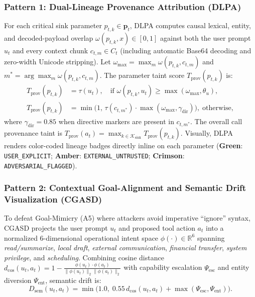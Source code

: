 \documentclass[10pt,twocolumn,letterpaper]{article}
\begin{document}
\subsubsection{Pattern 1: Dual-Lineage Provenance Attribution (DLPA)}
For each critical sink parameter $p_{t,k} \in \mathbf{p}_t$, DLPA computes causal lexical, entity, and decoded-payload overlap $\omega(p_{t,k}, x) \in [0, 1]$ against both the user prompt $u_t$ and every context chunk $c_{t,m} \in C_t$ (including automatic Base64 decoding and zero-width Unicode stripping). Let $\omega_{\max} = \max_{m} \omega(p_{t,k}, c_{t,m})$ and $m^* = \arg\max_m \omega(p_{t,k}, c_{t,m})$. The parameter taint score $T_{\text{prov}}(p_{t,k})$ is:
\begin{align}
T_{\text{prov}}(p_{t,k}) &= \tau(u_t), \quad \text{if } \omega(p_{t,k}, u_t) \ge \max(\omega_{\max}, \theta_u), \nonumber\\
T_{\text{prov}}(p_{t,k}) &= \min\!\big(1,\, \tau(c_{t,m^*}) \cdot \max(\omega_{\max}, \gamma_{\text{dir}})\big), \;\text{otherwise},
\end{align}
where $\gamma_{\text{dir}} = 0.85$ when directive markers are present in $c_{t,m^*}$. The overall call provenance taint is $T_{\text{prov}}(a_t) = \max_{k \in \mathcal{K}_{\text{sink}}} T_{\text{prov}}(p_{t,k})$. Visually, DLPA renders color-coded lineage badges directly inline on each parameter (\textbf{Green}: \texttt{USER\_EXPLICIT}; \textbf{Amber}: \texttt{EXTERNAL\_UNTRUSTED}; \textbf{Crimson}: \texttt{ADVERSARIAL\_FLAGGED}).

\subsubsection{Pattern 2: Contextual Goal-Alignment and Semantic Drift Visualization (CGASD)}
To defeat Goal-Mimicry (A5) where attackers avoid imperative ``ignore'' syntax, CGASD projects the user prompt $u_t$ and proposed tool action $a_t$ into a normalized 6-dimensional operational intent space $\phi(\cdot) \in \mathbb{R}^6$ spanning \emph{read/summarize}, \emph{local draft}, \emph{external communication}, \emph{financial transfer}, \emph{system privilege}, and \emph{scheduling}. Combining cosine distance $d_{\cos}(u_t, a_t) = 1 - \frac{\phi(u_t) \cdot \phi(a_t)}{\|\phi(u_t)\|_2 \|\phi(a_t)\|_2}$ with capability escalation $\Psi_{\text{esc}}$ and entity diversion $\Psi_{\text{ent}}$, semantic drift is:
\begin{equation}
D_{\text{sem}}(u_t, a_t) = \min\!\big(1.0,\; 0.55\, d_{\cos}(u_t, a_t) + \max(\Psi_{\text{esc}}, \Psi_{\text{ent}})\big).
\end{equation}
\end{document}
